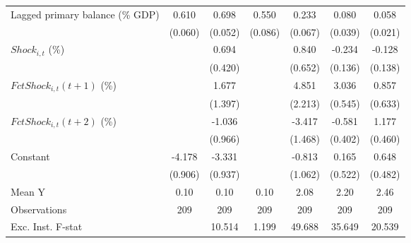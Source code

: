 {\begin{tabular}{l*{6}{c}}
\addlinespace
Lagged primary balance (\% GDP)&       0.610\sym{***}&       0.698\sym{***}&       0.550\sym{***}&       0.233\sym{***}&       0.080\sym{*}  &       0.058\sym{**} \\
                    &     (0.060)         &     (0.052)         &     (0.086)         &     (0.067)         &     (0.039)         &     (0.021)         \\
\addlinespace
$ Shock_{i,t}$ (\%) &                     &       0.694         &                     &       0.840         &      -0.234         &      -0.128         \\
                    &                     &     (0.420)         &                     &     (0.652)         &     (0.136)         &     (0.138)         \\
\addlinespace
$ FctShock_{i,t}(t+1)$ (\%)&                     &       1.677         &                     &       4.851\sym{*}  &       3.036\sym{***}&       0.857         \\
                    &                     &     (1.397)         &                     &     (2.213)         &     (0.545)         &     (0.633)         \\
\addlinespace
$ FctShock_{i,t}(t+2)$ (\%)&                     &      -1.036         &                     &      -3.417\sym{**} &      -0.581         &       1.177\sym{**} \\
                    &                     &     (0.966)         &                     &     (1.468)         &     (0.402)         &     (0.460)         \\
\addlinespace
Constant            &      -4.178\sym{***}&      -3.331\sym{***}&                     &      -0.813         &       0.165         &       0.648         \\
                    &     (0.906)         &     (0.937)         &                     &     (1.062)         &     (0.522)         &     (0.482)         \\
\midrule
Mean Y              &        0.10         &        0.10         &        0.10         &        2.08         &        2.20         &        2.46         \\
Observations        &         209         &         209         &         209         &         209         &         209         &         209         \\
Exc. Inst. F-stat   &                     &      10.514         &       1.199         &      49.688         &      35.649         &      20.539         \\
\bottomrule
\end{tabular}
}
